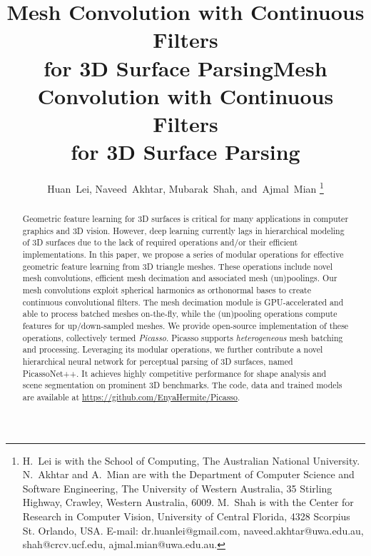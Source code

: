 \title{Mesh Convolution with Continuous Filters \\for
 3D Surface Parsing}



\title{Mesh Convolution with Continuous Filters \\for
 3D Surface Parsing}

\author{Huan~Lei,
        Naveed~Akhtar,
        Mubarak~Shah,
        and~Ajmal~Mian %
\thanks{H.~Lei is with the School of Computing, The Australian National University. N.~Akhtar and A.~Mian are with the Department of Computer Science and Software Engineering, The University of Western Australia, 35 Stirling
Highway, Crawley, Western Australia, 6009. M.~Shah is with the Center for Research in Computer Vision, University of Central Florida, 4328 Scorpius St. Orlando, USA.
E-mail: dr.huanlei@gmail.com, naveed.akhtar@uwa.edu.au, shah@crcv.ucf.edu, 
ajmal.mian@uwa.edu.au.}%
}

\maketitle

\begin{abstract}
Geometric feature learning {\color{black}for 3D surfaces is critical for many applications in computer graphics and 3D vision.} 
However, deep learning currently lags in hierarchical modeling of  3D surfaces due to the lack of required operations and/or their efficient implementations. In this paper, we propose a series of modular operations for effective geometric feature learning from 3D triangle meshes. These operations include novel mesh convolutions, efficient mesh decimation and associated mesh (un)poolings. 
{\color{black}Our mesh convolutions exploit spherical harmonics as orthonormal bases to create continuous  convolutional filters.} 
The mesh decimation module is GPU-accelerated and able to process batched meshes on-the-fly, while the (un)pooling operations compute features for up/down-sampled meshes. 
We provide open-source implementation of these operations, collectively termed \textit{Picasso}.  
{\color{black}Picasso supports \textit{heterogeneous} mesh batching and processing. Leveraging its modular operations, we further contribute a novel hierarchical neural network for perceptual parsing of 3D surfaces, named PicassoNet++.} It achieves highly competitive performance for shape analysis and scene segmentation on prominent 3D benchmarks. The code, data and trained models are available at \href{https://github.com/EnyaHermite/Picasso}{https://github.com/EnyaHermite/Picasso}.
\end{abstract}

